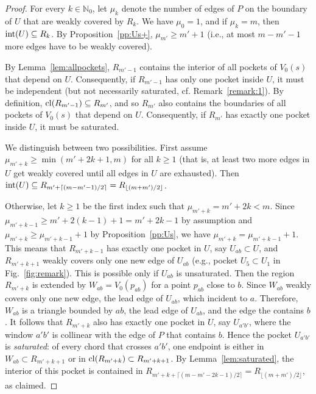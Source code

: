 \documentclass[12pt]{article}
\newcommand{\ceil}[1]{\lceil #1 \rceil}
\newcommand{\floor}[1]{{\lfloor #1 \rfloor}}
\begin{document}
\begin{proof}
For every $k\in \mathbb{N}_0$, let $\mu_k$ denote the number of edges of $P$ on the boundary of $U$ that are weakly covered by $R_k$. We have $\mu_0=1$, and if $\mu_k=m$, then ${\rm int}(U)\subseteq R_k$.
By Proposition~\ref{pp:Us+}, $\mu_{m'}\geq m'+1$  (i.e., at most $m-m'-1$ more edges
have to be weakly covered).

By Lemma~\ref{lem:allpockets}, $R_{m'-1}$ contains the interior of all pockets of $V_0(s)$ that depend on $U$. Consequently, if $R_{m'-1}$ has only one pocket inside $U$, it must be independent (but not necessarily saturated, cf. Remark~\ref{remark:1}). By definition, ${\rm cl}(R_{m'-1})\subseteq R_{m'}$, and so $R_{m'}$ also contains the boundaries of all pockets of $V_0(s)$ that depend on $U$. Consequently, if $R_{m'}$ has exactly one pocket inside $U$, it must be saturated.

We distinguish between two possibilities. First assume $\mu_{m'+k}\geq \min(m'+2k+1,m)$ for all $k\geq 1$ (that is, at least two more edges in $U$ get weakly covered until all edges in $U$ are exhausted). Then ${\rm int}(U)\subseteq R_{m'+\ceil{(m-m'-1)/2}} = R_{\floor{(m+m')/2}}$.

Otherwise, let $k\geq 1$ be the first index such that $\mu_{m'+k}=m'+2k<m$. Since $\mu_{m'+k-1}\geq m'+2(k-1)+1=m'+2k-1$ by assumption and $\mu_{m'+k} \geq  \mu_{m'+k-1}+1$ by Proposition~\ref{pp:Us}, we have $\mu_{m'+k} = \mu_{m'+k-1}+1$. This means that $R_{m'+k-1}$ has exactly one pocket in $U$, say $U_{ab}\subset U$, and $R_{m'+k+1}$ weakly covers only one new edge of $U_{ab}$ (e.g., pocket $U_5\subset U_1$ in Fig.~\ref{fig:remark}). This is possible only if $U_{ab}$ is unsaturated. Then the region $R_{m'+k}$ is extended by $W_{ab}=V_0(p_{ab})$ for a point $p_{ab}$ close to $b$. Since $W_{ab}$ weakly covers only one new edge, the lead edge of $U_{ab}$, which incident to $a$. Therefore, $W_{ab}$ is a triangle bounded by $ab$, the lead edge of $U_{ab}$, and the edge the contains $b$. It follows that $R_{m'+k}$ also has exactly one pocket in $U$, say $U_{a'b'}$, where the window $a'b'$ is collinear with the edge of $P$ that contains $b$. Hence the pocket $U_{a'b'}$ is \emph{saturated}:
of every chord that crosses $a'b'$, one endpoint is either in $W_{ab}\subset R_{m'+k+1}$ or in ${\rm cl}(R_{m'+k})\subset R_{m'+k+1}$. By Lemma~\ref{lem:saturated}, the interior of this pocket is contained in $R_{m'+k+ \ceil{(m-m'-2k-1)/2}} =R_{\floor{(m+m')/2}}$, as claimed.
\end{proof}
\end{document}
